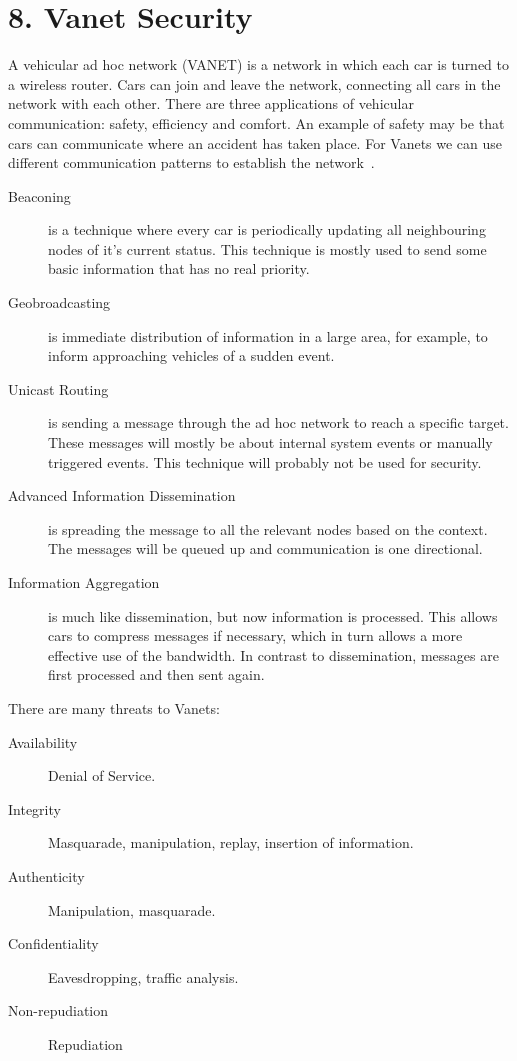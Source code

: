\documentclass{article}
\begin{document}
\newpage
\section*{8. Vanet Security}
A vehicular ad hoc network (VANET) is a network in which each car is turned to a wireless router. Cars can join and leave the network, connecting all cars in the network with each other. There are three applications of vehicular communication: safety, efficiency and comfort. An example of safety may be that cars can communicate where an accident has taken place. For Vanets we can use different communication patterns to establish the network~\cite{schoch2008communication}.

\begin{description}
\item[Beaconing] is a technique where every car is periodically updating all neighbouring nodes of it's current status. This technique is mostly used to send some basic information that has no real priority.
\item[Geobroadcasting] is immediate distribution of information in a large area, for example, to inform approaching vehicles of a sudden event.
\item[Unicast Routing] is sending a message through the ad hoc network to reach a specific target. These messages will mostly be about internal system events or manually triggered events. This technique will probably not be used for security.
\item[Advanced Information Dissemination] is spreading the message to all the relevant nodes based on the context. The messages will be queued up and communication is one directional.
\item[Information Aggregation] is much like dissemination, but now information is processed. This allows cars to compress messages if necessary, which in turn allows a more effective use of the bandwidth. In contrast to dissemination, messages are first processed and then sent again.
\end{description}

There are many threats to Vanets:

\begin{description}
\item[Availability] Denial of Service.
\item[Integrity] Masquarade, manipulation, replay, insertion of information.
\item[Authenticity] Manipulation, masquarade.
\item[Confidentiality] Eavesdropping, traffic analysis.
\item[Non-repudiation] Repudiation
\end{description}
\end{document}

